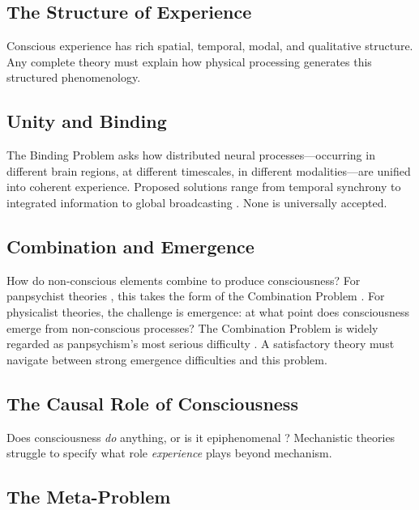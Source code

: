 \documentclass[12pt]{article}
\begin{document}
\subsection{The Structure of Experience}

Conscious experience has rich spatial, temporal, modal, and qualitative structure. Any complete theory must explain how physical processing generates this structured phenomenology.


\subsection{Unity and Binding}

The Binding Problem \citep{Treisman1980,Treisman1996,Revonsuo1999} asks how distributed neural processes---\hspace{0pt}occurring in different brain regions, at different timescales, in different modalities---\hspace{0pt}are unified into coherent experience. Proposed solutions range from temporal synchrony \citep{Gray1989,Singer1995,Fries2005,Fries2015} to integrated information \citep{Tononi2004} to global broadcasting \citep{Baars1988}. None is universally accepted.


\subsection{Combination and Emergence}

How do non-conscious elements combine to produce consciousness? For panpsychist theories \citep{Goff2019,Strawson2006}, this takes the form of the Combination Problem \citep{James1890,Chalmers2016}. For physicalist theories, the challenge is emergence: at what point does consciousness emerge from non-conscious processes? The Combination Problem is widely regarded as panpsychism's most serious difficulty \citep{Chalmers2016,Coleman2014}. A satisfactory theory must navigate between strong emergence difficulties \citep{Kim1993} and this problem.


\subsection{The Causal Role of Consciousness}

Does consciousness \emph{do} anything, or is it epiphenomenal \citep{Huxley1874,Jackson1982}? Mechanistic theories struggle to specify what role \emph{experience} plays beyond mechanism.


\subsection{The Meta-Problem}
\end{document}
